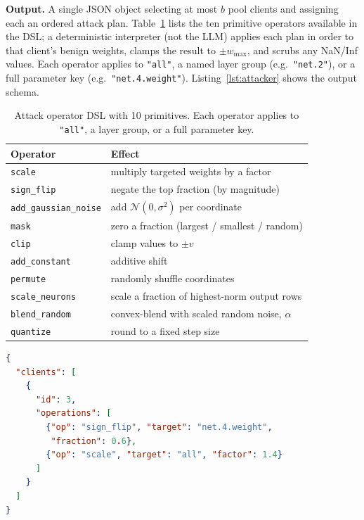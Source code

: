 \documentclass[conference]{IEEEtran}
\begin{document}
\textbf{Output.} A single JSON object selecting at most $b$ pool clients and assigning each an ordered attack plan. Table~\ref{tab:ops} lists the ten primitive operators available in the DSL; a deterministic interpreter (not the LLM) applies each plan in order to that client's benign weights, clamps the result to $\pm w_{\max}$, and scrubs any NaN/Inf values. Each operator applies to \texttt{"all"}, a named layer group (e.g.\ \texttt{"net.2"}), or a full parameter key (e.g.\ \texttt{"net.4.weight"}). Listing~\ref{lst:attacker} shows the output schema.

\begin{table}[t]
\caption{Attack operator DSL with 10 primitives. Each operator applies to \texttt{"all"}, a layer group, or a full parameter key.}
\label{tab:ops}
\centering
\small
\begin{tabular}{@{}ll@{}}
\toprule
\textbf{Operator} & \textbf{Effect} \\
\midrule
\texttt{scale} & multiply targeted weights by a factor \\
\texttt{sign\_flip} & negate the top fraction (by magnitude) \\
\texttt{add\_gaussian\_noise} & add $\mathcal{N}(0,\sigma^2)$ per coordinate \\
\texttt{mask} & zero a fraction (largest / smallest / random) \\
\texttt{clip} & clamp values to $\pm v$ \\
\texttt{add\_constant} & additive shift \\
\texttt{permute} & randomly shuffle coordinates \\
\texttt{scale\_neurons} & scale a fraction of highest-norm output rows \\
\texttt{blend\_random} & convex-blend with scaled random noise, $\alpha$ \\
\texttt{quantize} & round to a fixed step size \\
\bottomrule
\end{tabular}
\end{table}

\begin{lstlisting}[language=json, caption={Illustrative attacker output schema (values are illustrative, not measured).}, label={lst:attacker}]
{
  "clients": [
    {
      "id": 3,
      "operations": [
        {"op": "sign_flip", "target": "net.4.weight",
         "fraction": 0.6},
        {"op": "scale", "target": "all", "factor": 1.4}
      ]
    }
  ]
}
\end{lstlisting}
\end{document}
